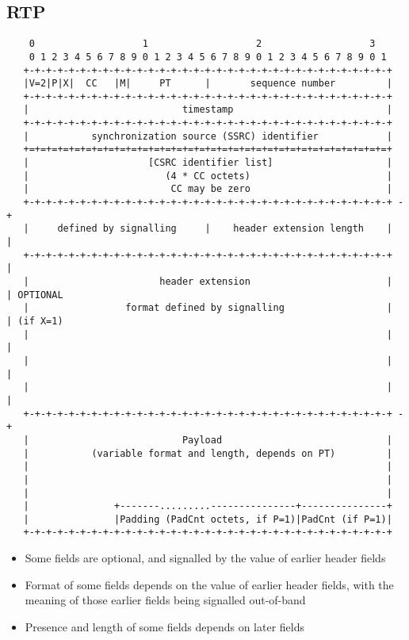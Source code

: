 \documentclass[10pt,a4paper]{article}
\begin{document}
\subsection{RTP}

\footnotesize
\begin{verbatim}
    0                   1                   2                   3
    0 1 2 3 4 5 6 7 8 9 0 1 2 3 4 5 6 7 8 9 0 1 2 3 4 5 6 7 8 9 0 1
   +-+-+-+-+-+-+-+-+-+-+-+-+-+-+-+-+-+-+-+-+-+-+-+-+-+-+-+-+-+-+-+-+
   |V=2|P|X|  CC   |M|     PT      |       sequence number         |
   +-+-+-+-+-+-+-+-+-+-+-+-+-+-+-+-+-+-+-+-+-+-+-+-+-+-+-+-+-+-+-+-+
   |                           timestamp                           |
   +-+-+-+-+-+-+-+-+-+-+-+-+-+-+-+-+-+-+-+-+-+-+-+-+-+-+-+-+-+-+-+-+
   |           synchronization source (SSRC) identifier            |
   +=+=+=+=+=+=+=+=+=+=+=+=+=+=+=+=+=+=+=+=+=+=+=+=+=+=+=+=+=+=+=+=+
   |                     [CSRC identifier list]                    |
   |                        (4 * CC octets)                        |
   |                         CC may be zero                        |
   +-+-+-+-+-+-+-+-+-+-+-+-+-+-+-+-+-+-+-+-+-+-+-+-+-+-+-+-+-+-+-+-+ -+
   |     defined by signalling     |    header extension length    |  |
   +-+-+-+-+-+-+-+-+-+-+-+-+-+-+-+-+-+-+-+-+-+-+-+-+-+-+-+-+-+-+-+-+  |
   |                       header extension                        |  | OPTIONAL
   |                 format defined by signalling                  |  | (if X=1)
   |                                                               |  |
   |                                                               |  |
   |                                                               |  |
   +-+-+-+-+-+-+-+-+-+-+-+-+-+-+-+-+-+-+-+-+-+-+-+-+-+-+-+-+-+-+-+-+ -+
   |                           Payload                             |
   |           (variable format and length, depends on PT)         |
   |                                                               |
   |                                                               |
   |                                                               |
   |               +-------.........---------------+---------------+
   |               |Padding (PadCnt octets, if P=1)|PadCnt (if P=1)|
   +-+-+-+-+-+-+-+-+-+-+-+-+-+-+-+-+-+-+-+-+-+-+-+-+-+-+-+-+-+-+-+-+
\end{verbatim}
\normalsize

\begin{itemize}
  \item Some fields are optional, and signalled by the value of earlier 
        header fields
  \item Format of some fields depends on the value of earlier header fields,
        with the meaning of those earlier fields being signalled out-of-band
  \item Presence and length of some fields depends on later fields
\end{itemize}
\end{document}
